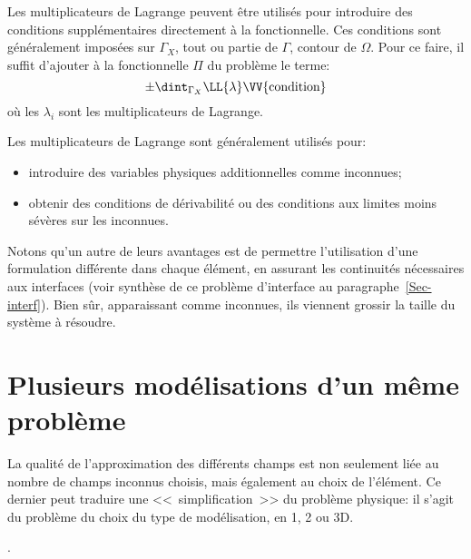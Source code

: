 \bigskip
Les multiplicateurs de Lagrange
peuvent être utilisés pour introduire
des conditions supplémentaires directement à la fonctionnelle.
Ces conditions sont généralement imposées sur $\Gamma_X$, tout ou
partie de $\Gamma$, contour de $\Omega$.
Pour ce faire, il suffit d'ajouter à la fonctionnelle $\Pi$
du problème le terme:
\begin{equation}
   \pm\dint_{\Gamma_X} \LL{\lambda}\VV{\text{condition}}
\end{equation}
où les $\lambda_i$ sont les multiplicateurs de Lagrange.

\medskip
Les multiplicateurs de Lagrange
sont généralement utilisés pour:
\begin{itemize}
   \item introduire des variables physiques additionnelles comme
         inconnues;
   \item obtenir des conditions de dérivabilité ou des conditions aux
         limites moins sévères sur les inconnues.
\end{itemize}

\medskip
Notons qu'un autre de leurs avantages est de permettre l'utilisation d'une formulation différente
dans chaque élément, en assurant les continuités nécessaires aux interfaces (voir synthèse
de ce problème d'interface au paragraphe~\ref{Sec-interf}).
Bien sûr, apparaissant comme inconnues, ils viennent grossir la taille du système à
résoudre.










\medskip
\section{Plusieurs modélisations d'un même problème}\label{Sec-PlusModel}

La qualité de l'approximation des différents champs est non seulement liée
au nombre de champs inconnus choisis, mais également au choix de l'élément.
Ce dernier peut traduire une <<~simplification~>> du problème physique:
il s'agit du problème du choix du type de modélisation, en 1, 2 ou 3D.

.

